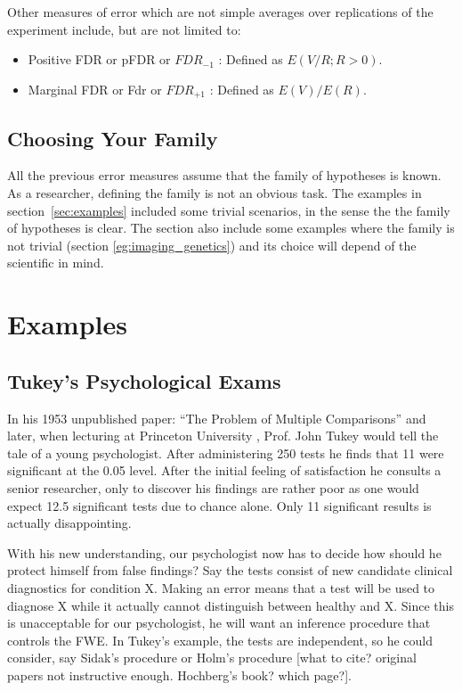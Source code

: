 \documentclass[draft,12pt]{article}
\begin{document}
Other measures of error which are not simple averages over replications of the experiment include, but are not limited to:
\begin{itemize}
\item Positive FDR or pFDR \citep{storey_direct_2002} or $FDR_{-1}$ \citep{benjamini_discovering_2010} : Defined as $E(V/R;R>0)$.
\item Marginal FDR \citep{sun_oracle_2007} or Fdr \citep{efron_microarrays_2008} or $FDR_{+1}$ \citep{benjamini_discovering_2010}: Defined as $E(V)/E(R)$.
\end{itemize}




\subsection{Choosing Your Family}
All the previous error measures assume that the family of hypotheses is known. As a researcher, defining the family is not an obvious task. The examples in section~\ref{sec:examples} included some trivial scenarios, in the sense the the family of hypotheses is clear. The section also include some examples where the family is not trivial (section \ref{eg:imaging_genetics}) and its choice will depend of the scientific in mind.




\section{\label{sec:examples}Examples}



\subsection{Tukey's Psychological Exams}
In his 1953 unpublished paper: ``The Problem of Multiple Comparisons'' \citep{benjamini_john_2002} and later, when lecturing at Princeton University \citet{donoho_higher_2004}, Prof. John Tukey would tell the tale of a young psychologist. After administering 250 tests he finds that 11 were significant at the 0.05 level. After the initial feeling of satisfaction he consults a senior researcher, only to discover his findings are rather poor as one  would expect 12.5 significant tests due to chance alone. Only 11 significant results is actually disappointing.


With his new understanding, our psychologist now has to decide how should he protect himself from false findings? 
Say the tests consist of new candidate clinical diagnostics for condition X. Making an error means that a test will be used to diagnose X while it actually cannot distinguish between healthy and X. Since this is unacceptable for our psychologist, he will want an inference procedure that controls the FWE. In Tukey's example, the tests are independent, so he could consider, say Sidak's procedure or Holm's procedure [what to cite? original papers not instructive enough. Hochberg's book? which page?].
\end{document}
